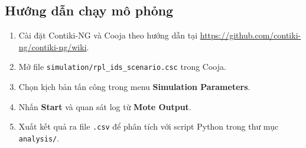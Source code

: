 \subsection{Hướng dẫn chạy mô phỏng}

\begin{enumerate}
  \item Cài đặt Contiki-NG và Cooja theo hướng dẫn tại
        \url{https://github.com/contiki-ng/contiki-ng/wiki}.
  \item Mở file \texttt{simulation/rpl\_ids\_scenario.csc} trong Cooja.
  \item Chọn kịch bản tấn công trong menu \textbf{Simulation Parameters}.
  \item Nhấn \textbf{Start} và quan sát log từ \textbf{Mote Output}.
  \item Xuất kết quả ra file \texttt{.csv} để phân tích với script Python
        trong thư mục \texttt{analysis/}.
\end{enumerate}
